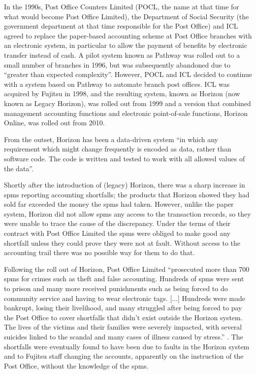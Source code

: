 In the 1990s, Post Office Counters Limited (POCL, the name at that time for what would become Post Office Limited), the Department of Social Security (the government department at that time responsible for the Post Office) and ICL agreed to replace the paper-based accounting scheme at Post Office branches with an electronic system, in particular to allow the payment of benefits by electronic transfer instead of cash. A pilot system known as Pathway was rolled out to a small number of branches in 1996, but was subsequently abandoned due to ``greater than expected complexity''. However, POCL and ICL decided to continue with a system based on Pathway to automate branch post offices. ICL was acquired by Fujitsu in 1998, and the resulting system, known as Horizon (now known as Legacy Horizon), was rolled out from 1999 and a version that combined management accounting functions and electronic point-of-sale functions, Horizon Online, was rolled out from 2010.

From the outset, Horizon has been a \gls{data-driven system} ``in which any requirement which
might change frequently is encoded as data, rather than software code. The code is
written and tested to work with all allowed values of the data''\cite{citation:bates_v_pol_tech}. 

Shortly after the introduction of (legacy) Horizon, there was a sharp increase in \glspl{spm} reporting accounting shortfalls; the products that Horizon showed they had sold far exceeded the money the \glspl{spm} had taken. However, unlike the paper system, Horizon did not allow \glspl{spm} any access to the transaction records, so they were unable to trace the cause of the discrepancy. Under the terms of their contract with Post Office Limited the \glspl{spm} were obliged to make good any shortfall unless they could prove they were not at fault. Without access to the accounting trail there was no possible way for them to do that.

Following the roll out of Horizon, Post Office Limited ``prosecuted more than 700 \glspl{spm}  for crimes such as theft and false accounting. Hundreds of \glspl{spm} were sent to prison and many more received punishments such as being forced to do community service and having to wear electronic tags. [...] Hundreds were made bankrupt, losing their livelihood, and many struggled after being forced to pay the Post Office to cover shortfalls that didn’t exist outside the Horizon system. The lives of the victims and their families were severely impacted, with several suicides linked to the scandal and many cases of illness caused by stress.'' \cite{citation:cw_horizon}. The shortfalls were eventually found to have been due to faults in the Horizon system and to Fujitsu staff changing the accounts, apparently on the instruction of the Post Office, without the knowledge of the \glspl{spm}.

